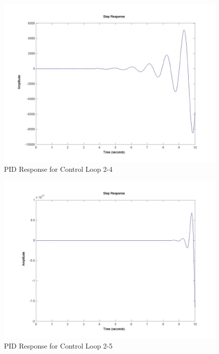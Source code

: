 	\begin{figure}[H]
		\includegraphics[width=\textwidth]{part2-4.jpg}
		\caption{PID Response for Control Loop 2-4}
	\end{figure}
	
	\begin{figure}[H]
		\includegraphics[width=\textwidth]{part2-5.jpg}
		\caption{PID Response for Control Loop 2-5}
	\end{figure}
	
